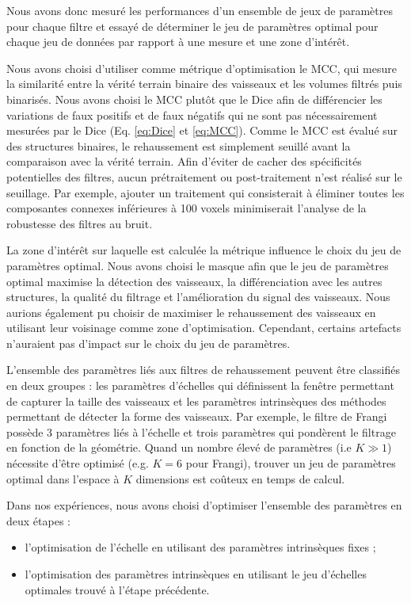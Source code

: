 Nous avons donc mesuré les performances d'un ensemble de jeux de paramètres pour chaque filtre et essayé de déterminer le jeu de paramètres optimal pour chaque jeu de données par rapport à une mesure et une zone d'intérêt.

Nous avons choisi d'utiliser comme métrique d'optimisation le MCC, qui mesure la similarité entre la vérité terrain binaire des vaisseaux et les volumes filtrés puis binarisés. Nous avons choisi le MCC plutôt que le Dice afin de différencier les variations de faux positifs et de faux négatifs qui ne sont pas nécessairement mesurées par le Dice (Eq. \ref{eq:Dice} et \ref{eq:MCC}). Comme le MCC est évalué sur des structures binaires, le rehaussement est simplement seuillé avant la comparaison avec la vérité terrain. Afin d'éviter de cacher des spécificités potentielles des filtres, aucun prétraitement ou post-traitement n'est réalisé sur le seuillage. Par exemple, ajouter un traitement qui consisterait à éliminer toutes les composantes connexes inférieures à 100 voxels minimiserait l'analyse de la robustesse des filtres au bruit.

La zone d'intérêt sur laquelle est calculée la métrique influence le choix du jeu de paramètres optimal. Nous avons choisi le masque \maskglobal afin que le jeu de paramètres optimal maximise la détection des vaisseaux, la  différenciation avec les autres structures, la qualité du filtrage et l'amélioration du signal des vaisseaux. Nous aurions également pu choisir de maximiser le rehaussement des vaisseaux en utilisant leur voisinage comme zone d'optimisation. Cependant, certains artefacts n'auraient pas d'impact sur le choix du jeu de paramètres. 

L'ensemble des paramètres liés aux filtres de rehaussement peuvent être classifiés en deux groupes : les paramètres d'échelles qui définissent la fenêtre permettant de capturer la taille des vaisseaux et les paramètres intrinsèques des méthodes permettant de détecter la forme des vaisseaux. Par exemple, le filtre de Frangi possède 3 paramètres liés à l'échelle et trois paramètres qui pondèrent le filtrage en fonction de la géométrie. Quand un nombre élevé de paramètres (i.e $K \gg 1$) nécessite d'être optimisé (e.g. $K=6$ pour Frangi), trouver un jeu de paramètres optimal dans l'espace à $K$ dimensions est coûteux en temps de calcul.

Dans nos expériences, nous avons choisi d'optimiser l'ensemble des paramètres en deux étapes :

\begin{itemize}
\item l'optimisation de l'échelle en utilisant des paramètres intrinsèques fixes ;
\item l'optimisation des paramètres intrinsèques en utilisant le jeu d'échelles optimales trouvé à l'étape précédente.
\end{itemize}

